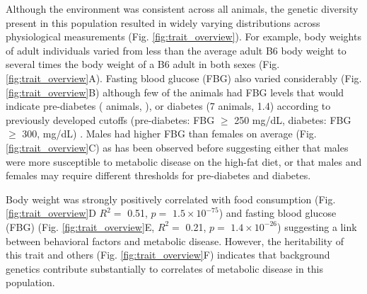 \documentclass[
]{article}
\begin{document}
Although the environment was consistent across all animals, the genetic
diversity present in this population resulted in widely varying
distributions across physiological measurements (Fig.
\ref{fig:trait_overview}). For example, body weights of adult
individuals varied from less than the average adult B6 body weight to
several times the body weight of a B6 adult in both sexes (Fig.
\ref{fig:trait_overview}A). Fasting blood glucose (FBG) also varied
considerably (Fig. \ref{fig:trait_overview}B) although few of the
animals had FBG levels that would indicate pre-diabetes ( animals, ), or
diabetes (7 animals, 1.4) according to previously developed cutoffs
(pre-diabetes: FBG \(\geq\) 250 mg/dL, diabetes: FBG \(\geq\) 300,
mg/dL) \cite{pmid17018838}. Males had higher FBG than females on average
(Fig. \ref{fig:trait_overview}C) as has been observed before suggesting
either that males were more susceptible to metabolic disease on the
high-fat diet, or that males and females may require different
thresholds for pre-diabetes and diabetes.

Body weight was strongly positively correlated with food consumption
(Fig. \ref{fig:trait_overview}D \(R^2 =\) 0.51, \(p=\)
\ensuremath{1.5\times 10^{-75}}) and fasting blood glucose (FBG) (Fig.
\ref{fig:trait_overview}E, \(R^2=\) 0.21, \(p =\)
\ensuremath{1.4\times 10^{-26}}) suggesting a link between behavioral
factors and metabolic disease. However, the heritability of this trait
and others (Fig. \ref{fig:trait_overview}F) indicates that background
genetics contribute substantially to correlates of metabolic disease in
this population.
\end{document}
